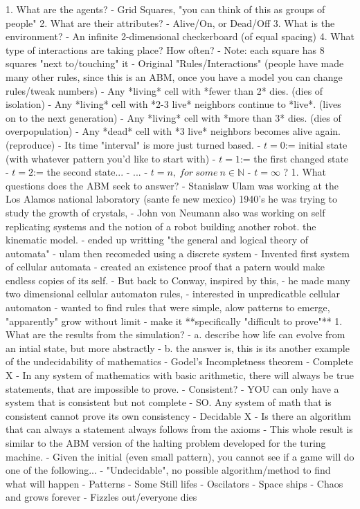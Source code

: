 \documentclass[12pt]{article}
\begin{document}
1. What are the agents?
	- Grid Squares, "you can think of this as groups of people"
2. What are their attributes?
	- Alive/On, or Dead/Off
3. What is the environment?
	- An infinite 2-dimensional checkerboard (of equal spacing)
4. What type of interactions are taking place? How often?
	- Note: each square has 8 squares "next to/touching" it
	- Original "Rules/Interactions" (people have made many other rules, since this is an ABM, once you have a model you can change rules/tweak numbers)
		- Any *living* cell with *fewer than 2* dies. (dies of isolation)
		- Any *living* cell with *2-3 live* neighbors continue to *live*. (lives on to the next generation)
		- Any *living* cell with *more than 3* dies. (dies of overpopulation)
			- Any *dead* cell with *3 live* neighbors becomes alive again. (reproduce)
		- Its time "interval" is more just turned based. 
			- $t=0$:= initial state (with whatever pattern you'd like to start with)
			- $t=1$:= the first changed state
			- $t=2$:= the second state...
			- ...
			- $t=n,~for~some~n\in \mathbb{N}$
			- $t=\infty$ ?
1. What questions does the ABM seek to answer?
	- Stanislaw Ulam was working at the Los Alamos national laboratory (sante fe new mexico) 1940's he was trying to study the growth of crystals, 
	- John von Neumann also was working on self replicating systems and the notion of a robot building another robot. the kinematic model.
		- ended up writting "the general and logical theory of automata"
		- ulam then recomeded using a discrete system
		- Invented first system of cellular automata
			- created an existence proof that a patern would make endless copies of its self.
	- But back to Conway, inspired by this, 
		- he made many two dimensional cellular automaton rules, 
			- interested in unpredicatble cellular automaton
			- wanted to find rules that were simple, alow patterns to emerge, "apparently" grow without limit
			- make it **specifically "difficult to prove"**
1. What are the results from the simulation?
	- a.  describe how life can evolve from an intial state, but more abstractly
	- b.  the answer is, this is its another example of the undecidability of mathematics 
		- Godel's Incompletness theorem
			- Complete X
				- In any system of mathematics with basic arithmetic, there will always be true statements, that are impossible to prove.
			- Consistent?
				- YOU can only have a system that is consistent but not complete
				- SO. Any system of math that is consistent cannot prove its own consistency
			- Decidable X
				- Is there an algorithm that can always a statement always follows from the axioms
					- This whole result is similar to the ABM version of the halting problem developed for the turing machine.
				- Given the initial (even small pattern), you cannot see if a game will do one of the following...
				- "Undecidable", no possible algorithm/method to find what will happen
	- Patterns
		- Some Still lifes 
		- Oscilators
		- Space ships
	- Chaos and grows forever
	- Fizzles out/everyone dies
\end{document}
